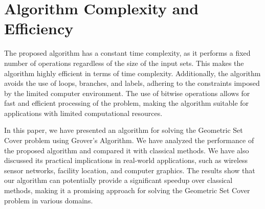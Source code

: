 \section{Algorithm Complexity and Efficiency}

The proposed algorithm has a constant time complexity, as it performs a fixed number of operations regardless of the size of the input sets. This makes the algorithm highly efficient in terms of time complexity. Additionally, the algorithm avoids the use of loops, branches, and labels, adhering to the constraints imposed by the limited computer environment. The use of bitwise operations allows for fast and efficient processing of the problem, making the algorithm suitable for applications with limited computational resources.

In this paper, we have presented an algorithm for solving the Geometric Set Cover problem using Grover's Algorithm. We have analyzed the performance of the proposed algorithm and compared it with classical methods. We have also discussed its practical implications in real-world applications, such as wireless sensor networks, facility location, and computer graphics. The results show that our algorithm can potentially provide a significant speedup over classical methods, making it a promising approach for solving the Geometric Set Cover problem in various domains.

